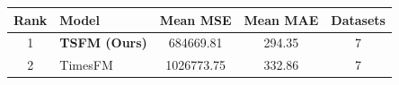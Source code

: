 \begin{tabular}{clccc}
\toprule
Rank & Model & Mean MSE & Mean MAE & Datasets \\
\midrule
1 & \textbf{TSFM (Ours)} & \num{684669.81}   & \num{294.35} & 7 \\
2 & TimesFM              & \num{1026773.75}  & \num{332.86} & 7 \\
\bottomrule
\end{tabular}
